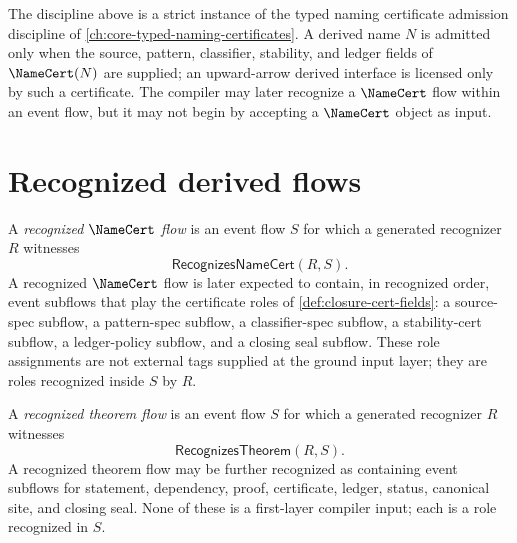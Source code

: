 \begin{remark}
\label{rem:ground-event-flow-relation-to-namecert}
The discipline above is a strict instance of the typed naming certificate admission discipline of \autoref{ch:core-typed-naming-certificates}. A derived name $N$ is admitted only when the source, pattern, classifier, stability, and ledger fields of $\NameCert(N)$ are supplied; an upward-arrow derived interface is licensed only by such a certificate. The compiler may later recognize a $\NameCert$ flow within an event flow, but it may not begin by accepting a $\NameCert$ object as input.
\end{remark}

\section{Recognized derived flows}
\label{sec:ground-event-flow-recognized-derived-flows}

\begin{definition}
\label{def:ground-event-flow-recognized-namecert-flow}
A \emph{recognized $\NameCert$ flow} is an event flow $S$ for which a generated recognizer $R$ witnesses
$$
  \mathsf{RecognizesNameCert}(R, S).
$$
A recognized $\NameCert$ flow is later expected to contain, in recognized order, event subflows that play the certificate roles of \autoref{def:closure-cert-fields}: a source-spec subflow, a pattern-spec subflow, a classifier-spec subflow, a stability-cert subflow, a ledger-policy subflow, and a closing seal subflow. These role assignments are not external tags supplied at the ground input layer; they are roles recognized inside $S$ by $R$.
\end{definition}

\begin{definition}
\label{def:ground-event-flow-recognized-theorem-flow}
A \emph{recognized theorem flow} is an event flow $S$ for which a generated recognizer $R$ witnesses
$$
  \mathsf{RecognizesTheorem}(R, S).
$$
A recognized theorem flow may be further recognized as containing event subflows for statement, dependency, proof, certificate, ledger, status, canonical site, and closing seal. None of these is a first-layer compiler input; each is a role recognized in $S$.
\end{definition}

